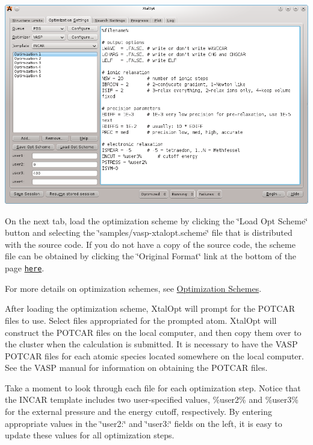 \begin{DoxyImageNoCaption}
  \mbox{\includegraphics[width=\textwidth]{opt-set-vasp.png}}
\end{DoxyImageNoCaption}


On the next tab, load the optimization scheme by clicking the \char`\"{}\+Load
\+Opt Scheme\char`\"{} button and selecting the \char`\"{}samples/vasp-\/xtalopt.\+scheme\char`\"{} file that is distributed with the source code. If you do not have a copy of the source code, the scheme file can be obtained by clicking the \char`\"{}\+Original Format\char`\"{} link at the bottom of the page \href{http://xtalopt.openmolecules.net/wiki/index.fcgi/browser/samples/vasp-xtalopt.scheme}{\tt here}.

For more details on optimization schemes, see \hyperlink{optschemes}{Optimization Schemes}.

After loading the optimization scheme, Xtal\+Opt will prompt for the P\+O\+T\+C\+A\+R files to use. Select files appropriated for the prompted atom. Xtal\+Opt will construct the P\+O\+T\+C\+A\+R files on the local computer, and then copy them over to the cluster when the calculation is submitted. It is necessary to have the V\+A\+S\+P P\+O\+T\+C\+A\+R files for each atomic species located somewhere on the local computer. See the V\+A\+S\+P manual for information on obtaining the P\+O\+T\+C\+A\+R files.

Take a moment to look through each file for each optimization step. Notice that the I\+N\+C\+A\+R template includes two user-\/specified values, \%user2\% and \%user3\% for the external pressure and the energy cutoff, respectively. By entering appropriate values in the \char`\"{}user2\+:\char`\"{} and \char`\"{}user3\+:\char`\"{} fields on the left, it is easy to update these values for all optimization steps.

